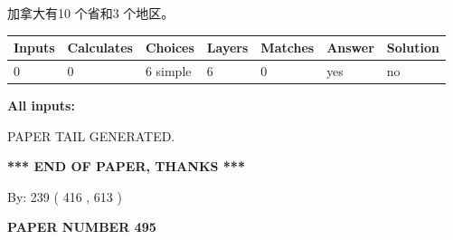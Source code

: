 \documentclass{ctexart}
\begin{document}
 
加拿大有10 个省和3 个地区。
 
 
\noindent{}
 
 
   
   
   
   
\noindent\begin{tabular}{|l|l|l|l|l|l|l|}
 \hline
Inputs & Calculates & Choices & Layers & Matches & Answer & Solution \\ \hline
 0  & 
 0  & 
 6
  simple  
  & 
 6  & 
 0  & 
  yes & 
  no 
  \\ \hline
 \end{tabular}
   
   
   
   
\noindent{}
   
   
   
   
\noindent\vspace{0.1in}\hspace{-0.08in} {\textbf{\Large{All inputs: }}}
   
   
   
   
   
   
 \vspace{0.2in}
 
   
   
\vspace{2.0in} PAPER TAIL GENERATED.
   
   
   
   
\vspace{1.0in} 
{\textbf{\large{ *** END OF PAPER, THANKS *** }}} 
   
   
\hspace{1.0in} By: 
 239 ( 416 ,  613 )
   
   
   
   
\newpage 
\setcounter{page}{ 
   495001 } 
   
   
   
   
 {\textbf{ \Large{ PAPER NUMBER  495  }}}
   
   
\vspace{0.2in}
   
   
   
   
   
   
   
\end{document}
